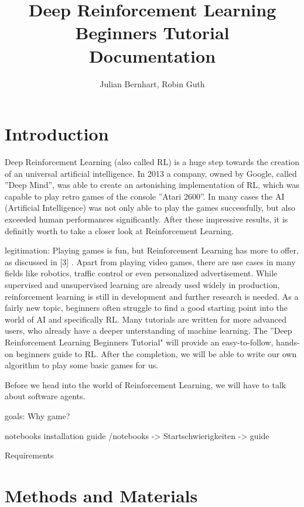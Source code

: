 \documentclass[a4paper]{article}
\title{Deep Reinforcement Learning Beginners Tutorial \\Documentation}
\author{Julian Bernhart, Robin Guth}
\begin{document}
	
	\maketitle
	\tableofcontents
	
	\section{Introduction}
	
		 Deep Reinforcement Learning (also called RL) is a huge step towards the creation of an universal artificial intelligence. In 2013 a company, owned by Google, called ''Deep Mind'', was able to create an astonishing implementation of RL, which was capable to play retro games of the console ''Atari 2600''. In many cases the AI (Artificial Intelligence) was not only able to play the games successfully, but also exceeded human performances significantly. After these impressive results, it is definitly worth to take a closer look at Reinforcement Learning.
	
	legitimation:	 
		 Playing games is fun, but Reinforcement Learning has more to offer, as discussed in [3] . Apart from playing video games, there are use cases in many fields like robotics, traffic control or even personalized advertisement. While supervised and unsupervised learning are already used widely in production, reinforcement learning is still in development and further research is needed. As a fairly new topic, beginners often struggle to find a good starting point into the world of AI and specifically RL. Many tutorials are written for more advanced users, who already have a deeper unterstanding of machine learning. The ''Deep Reinforcement Learning Beginners Tutorial" will provide an easy-to-follow, hands-on beginners guide to RL. After the completion, we will be able to write our own algorithm to play some basic games for us.
		 
		 Before we head into the world of Reinforcement Learning, we will have to talk about software agents.
	
	goals:
		 Why game?
		 
		 notebooks
		 installation guide /notebooks -> Startschwierigkeiten -> guide
		 
	Requirements
		 
	

	\section{Methods and Materials}
	
\end{document}
